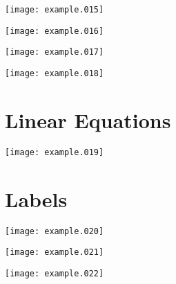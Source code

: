 \documentclass{article}
\newcommand{\figwidth}{0.95\linewidth}
\begin{document}
\begin{minipage}{\linewidth}
\begin{minipage}[b]{0.1\linewidth}
\texttt{[image: example.015]}
\end{minipage}
\hfill
\begin{minipage}[b]{0.1\linewidth}
\texttt{[image: example.016]}
\end{minipage}
\hfill
\begin{minipage}[b]{0.1\linewidth}
\texttt{[image: example.017]}
\end{minipage}
\hfill
\begin{minipage}[b]{0.1\linewidth}
\texttt{[image: example.018]}
\end{minipage}
\end{minipage}
\bigskip

\newpage
\section{Linear Equations}

\begin{minipage}{\linewidth}
\centering
\begin{minipage}[b]{0.4\linewidth}
\texttt{[image: example.019]}
\end{minipage}
\end{minipage}
\bigskip

\newpage
\section{Labels}

\begin{minipage}{\linewidth}
\begin{minipage}[b]{0.32\linewidth}
\texttt{[image: example.020]}
\end{minipage}
\hfill
\begin{minipage}[b]{0.32\linewidth}
\texttt{[image: example.021]}
\end{minipage}
\hfill
\begin{minipage}[b]{0.32\linewidth}
\texttt{[image: example.022]}
\end{minipage}
\end{minipage}
\bigskip
\end{document}

